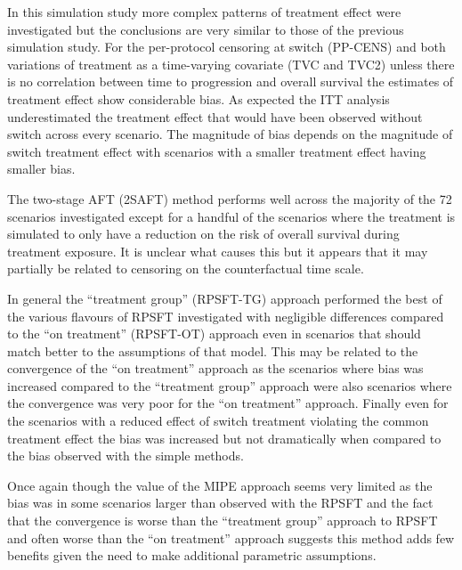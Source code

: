 In this simulation study more complex patterns of treatment effect were investigated but the conclusions are very similar to those of the previous simulation study. For the per-protocol censoring at switch (PP-CENS) and both variations of treatment as a time-varying covariate (TVC and TVC2) unless there is no correlation between time to progression and overall survival the estimates of treatment effect show considerable bias. As expected the ITT analysis underestimated the treatment effect that would have been observed without switch across every scenario. The magnitude of bias depends on the magnitude of switch treatment effect with scenarios with a smaller treatment effect having smaller bias.

The two-stage AFT (2SAFT) method performs well across the majority of the 72 scenarios investigated except for a handful of the scenarios where the treatment is simulated to only have a reduction on the risk of overall survival during treatment exposure. It is unclear what causes this but it appears that it may partially be related to censoring on the counterfactual time scale.

In general the ``treatment group'' (RPSFT-TG) approach performed the best of the various flavours of RPSFT investigated with negligible differences compared to the ``on treatment'' (RPSFT-OT) approach even in scenarios that should match better to the assumptions of that model. This may be related to the convergence of the ``on treatment'' approach as the scenarios where bias was increased compared to the ``treatment group'' approach were also scenarios where the convergence was very poor for the ``on treatment'' approach. Finally even for the scenarios with a reduced effect of switch treatment violating the common treatment effect the bias was increased but not dramatically when compared to the bias observed with the simple methods. 

Once again though the value of the MIPE approach seems very limited as the bias was in some scenarios larger than observed with the RPSFT and the fact that  the convergence is worse than the ``treatment group'' approach to RPSFT and often worse than the ``on treatment'' approach suggests this method adds few benefits given the need to make additional parametric assumptions.




